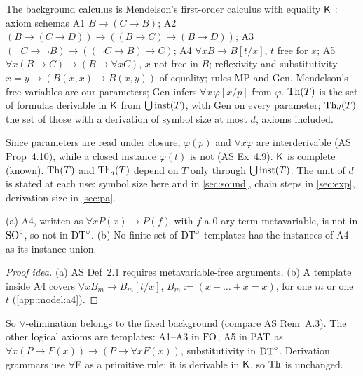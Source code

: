 \begin{definition}\label{def:model:calculus}
The background calculus is Mendelson's first-order calculus with equality $\mathsf{K}$ \citep[Ch.~2; chapter and numbering not checked]{mendelson1997introduction}: axiom schemas A1 $B\to(C\to B)$; A2 $(B\to(C\to D))\to((B\to C)\to(B\to D))$; A3 $(\neg C\to\neg B)\to((\neg C\to B)\to C)$; A4 $\forall x B\to B[t/x]$, $t$ free for $x$; A5 $\forall x(B\to C)\to(B\to\forall xC)$, $x$ not free in $B$; reflexivity and substitutivity $x=y\to(B(x,x)\to B(x,y))$ of equality; rules MP and Gen. Mendelson's free variables are our parameters; Gen infers $\forall x\,\varphi[x/p]$ from $\varphi$. $\mathrm{Th}(T)$ is the set of formulas derivable in $\mathsf{K}$ from $\bigcup\mathrm{inst}(T)$, with Gen on every parameter; $\mathrm{Th}_d(T)$ the set of those with a derivation of symbol size at most $d$, axioms included.
\end{definition}

Since parameters are read under closure, $\varphi(p)$ and $\forall x\varphi$ are interderivable (AS Prop~4.10), while a closed instance $\varphi(t)$ is not (AS Ex~4.9). $\mathsf{K}$ is complete (known). $\mathrm{Th}(T)$ and $\mathrm{Th}_d(T)$ depend on $T$ only through $\bigcup\mathrm{inst}(T)$. The unit of $d$ is stated at each use: symbol size here and in \cref{sec:sound}, chain steps in \cref{sec:exp}, derivation size in \cref{sec:pa}.

\begin{lemma}\label{lem:model:a4}
(a) A4, written as $\forall xP(x)\to P(f)$ with $f$ a $0$-ary term metavariable, is not in $\mathrm{SO}^{\circ}$, so not in $\mathrm{DT}^{\circ}$. (b) No finite set of $\mathrm{DT}^{\circ}$ templates has the instances of A4 as its instance union.
\end{lemma}

\begin{proof}[Proof idea]
(a) AS Def~2.1 requires metavariable-free arguments. (b) A template inside A4 covers $\forall xB_m\to B_m[t/x]$, $B_m:=(x+\dots+x=x)$, for one $m$ or one $t$ (\cref{app:model:a4}).
\end{proof}

So $\forall$-elimination belongs to the fixed background (compare AS Rem~A.3). The other logical axioms are templates: A1--A3 in $\mathrm{FO}$, A5 in $\mathrm{PAT}$ as $\forall x(P\to F(x))\to(P\to\forall xF(x))$, substitutivity in $\mathrm{DT}^{\circ}$. Derivation grammars use $\forall$E as a primitive rule; it is derivable in $\mathsf{K}$, so $\mathrm{Th}$ is unchanged.

